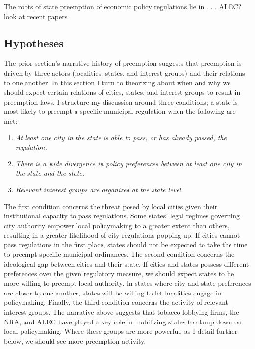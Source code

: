 \documentclass[12pt]{article}
\begin{document}
The roots of state preemption of economic policy regulations lie in . . . 
ALEC? look at recent papers 


\newpage
\subsection*{Hypotheses}
The prior section's narrative history of preemption suggests that preemption is driven by three actors (localities, states, and interest groups) and their relations to one another. In this section I turn to theorizing about when and why we should expect certain relations of cities, states, and interest groups to result in preemption laws. I structure my discussion around three conditions; a state is most likely to preempt a specific municipal regulation when the following are met:

\singlespacing
\begin{enumerate}
	\item \textit{At least one city in the state is able to pass, or has already passed, the regulation.}
	\item \textit{There is a wide divergence in policy preferences between at least one city in the state and the state.}
	\item \textit{Relevant interest groups are organized at the state level.}
\end{enumerate}

The first condition concerns the threat posed by local cities given their institutional capacity to pass regulations. Some states' legal regimes governing city authority empower local policymaking to a greater extent than others, resulting in a greater likelihood of city regulations popping up. If cities cannot pass regulations in the first place, states should not be expected to take the time to preempt specific municipal ordinances. The second condition concerns the ideological gap between cities and their state. If cities and states possess different preferences over the given regulatory measure, we should expect states to be more willing to preempt local authority. In states where city and state preferences are closer to one another, states will be willing to let localities engage in policymaking. Finally, the third condition concerns the activity of relevant interest groups. The narrative above suggests that tobacco lobbying firms, the NRA, and ALEC have played a key role in mobilizing states to clamp down on local policymaking. Where these groups are more powerful, as I detail further below, we should see more preemption activity. 
\end{document}
